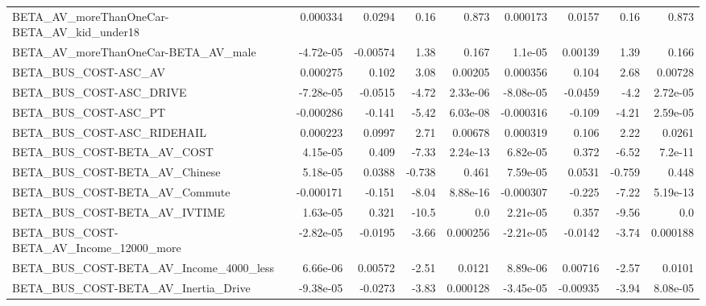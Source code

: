 \begin{tabular}{lrrrrrrrr}
BETA\_AV\_moreThanOneCar-BETA\_AV\_kid\_under18         &    0.000334 &       0.0294 &     0.16 &    0.873 &   0.000173 &      0.0157 &         0.16 &         0.873 \\
BETA\_AV\_moreThanOneCar-BETA\_AV\_male                &   -4.72e-05 &     -0.00574 &     1.38 &    0.167 &    1.1e-05 &     0.00139 &         1.39 &         0.166 \\
BETA\_BUS\_COST-ASC\_AV                               &    0.000275 &        0.102 &     3.08 &  0.00205 &   0.000356 &       0.104 &         2.68 &       0.00728 \\
BETA\_BUS\_COST-ASC\_DRIVE                            &   -7.28e-05 &      -0.0515 &    -4.72 & 2.33e-06 &  -8.08e-05 &     -0.0459 &         -4.2 &      2.72e-05 \\
BETA\_BUS\_COST-ASC\_PT                               &   -0.000286 &       -0.141 &    -5.42 & 6.03e-08 &  -0.000316 &      -0.109 &        -4.21 &      2.59e-05 \\
BETA\_BUS\_COST-ASC\_RIDEHAIL                         &    0.000223 &       0.0997 &     2.71 &  0.00678 &   0.000319 &       0.106 &         2.22 &        0.0261 \\
BETA\_BUS\_COST-BETA\_AV\_COST                         &    4.15e-05 &        0.409 &    -7.33 & 2.24e-13 &   6.82e-05 &       0.372 &        -6.52 &       7.2e-11 \\
BETA\_BUS\_COST-BETA\_AV\_Chinese                      &    5.18e-05 &       0.0388 &   -0.738 &    0.461 &   7.59e-05 &      0.0531 &       -0.759 &         0.448 \\
BETA\_BUS\_COST-BETA\_AV\_Commute                      &   -0.000171 &       -0.151 &    -8.04 & 8.88e-16 &  -0.000307 &      -0.225 &        -7.22 &      5.19e-13 \\
BETA\_BUS\_COST-BETA\_AV\_IVTIME                       &    1.63e-05 &        0.321 &    -10.5 &      0.0 &   2.21e-05 &       0.357 &        -9.56 &           0.0 \\
BETA\_BUS\_COST-BETA\_AV\_Income\_12000\_more            &   -2.82e-05 &      -0.0195 &    -3.66 & 0.000256 &  -2.21e-05 &     -0.0142 &        -3.74 &      0.000188 \\
BETA\_BUS\_COST-BETA\_AV\_Income\_4000\_less             &    6.66e-06 &      0.00572 &    -2.51 &   0.0121 &   8.89e-06 &     0.00716 &        -2.57 &        0.0101 \\
BETA\_BUS\_COST-BETA\_AV\_Inertia\_Drive                &   -9.38e-05 &      -0.0273 &    -3.83 & 0.000128 &  -3.45e-05 &    -0.00935 &        -3.94 &      8.08e-05 \\

\end{tabular}
